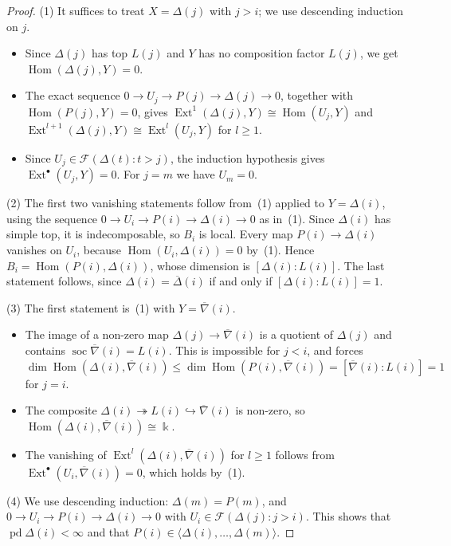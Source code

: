 \documentclass[11pt,reqno]{amsart}
\theoremstyle{plain}
\theoremstyle{definition}
\theoremstyle{remark}
\newcommand{\kk}{\Bbbk}
\DeclareMathOperator{\Hom}{Hom}
\DeclareMathOperator{\Ext}{Ext}
\DeclareMathOperator{\pd}{pd}
\DeclareMathOperator{\soc}{soc}
\newcommand{\thick}[1]{\langle #1\rangle}
\newcommand{\nablabar}{\overline{\nabla}}
\newcommand{\Deltabar}{\overline{\Delta}}
\newcommand{\cF}{\mathcal{F}}
\begin{document}
\begin{proof}
(1) It suffices to treat $X=\Delta(j)$ with $j>i$; we use descending induction on $j$.
\begin{itemize}
\item Since $\Delta(j)$ has top $L(j)$ and $Y$ has no composition factor $L(j)$, we get $\Hom(\Delta(j),Y)=0$.
\item The exact sequence $0\to U_j\to P(j)\to\Delta(j)\to0$, together with $\Hom(P(j),Y)=0$, gives $\Ext^1(\Delta(j),Y)\cong\Hom(U_j,Y)$ and $\Ext^{l+1}(\Delta(j),Y)\cong\Ext^l(U_j,Y)$ for $l\ge1$.
\item Since $U_j\in\cF(\Delta(t):t>j)$, the induction hypothesis gives $\Ext^\bullet(U_j,Y)=0$. For $j=m$ we have $U_m=0$.
\end{itemize}

(2) The first two vanishing statements follow from~(1) applied to $Y=\Delta(i)$, using the sequence $0\to U_i\to P(i)\to\Delta(i)\to0$ as in~(1). Since $\Delta(i)$ has simple top, it is indecomposable, so $B_i$ is local. Every map $P(i)\to\Delta(i)$ vanishes on $U_i$, because $\Hom(U_i,\Delta(i))=0$ by~(1). Hence $B_i=\Hom(P(i),\Delta(i))$, whose dimension is $[\Delta(i):L(i)]$. The last statement follows, since $\Delta(i)=\Deltabar(i)$ if and only if $[\Delta(i):L(i)]=1$.

(3) The first statement is~(1) with $Y=\nablabar(i)$.
\begin{itemize}
\item The image of a non-zero map $\Delta(j)\to\nablabar(i)$ is a quotient of $\Delta(j)$ and contains $\soc\nablabar(i)=L(i)$. This is impossible for $j<i$, and forces $\dim\Hom(\Delta(i),\nablabar(i))\le\dim\Hom(P(i),\nablabar(i))=[\nablabar(i):L(i)]=1$ for $j=i$.
\item The composite $\Delta(i)\twoheadrightarrow L(i)\hookrightarrow\nablabar(i)$ is non-zero, so $\Hom(\Delta(i),\nablabar(i))\cong\kk$.
\item The vanishing of $\Ext^{l}(\Delta(i),\nablabar(i))$ for $l\ge1$ follows from $\Ext^\bullet(U_i,\nablabar(i))=0$, which holds by~(1).
\end{itemize}

(4) We use descending induction: $\Delta(m)=P(m)$, and $0\to U_i\to P(i)\to\Delta(i)\to0$ with $U_i\in\cF(\Delta(j):j>i)$. This shows that $\pd\Delta(i)<\infty$ and that $P(i)\in\thick{\Delta(i),\dots,\Delta(m)}$.
\end{proof}

\end{document}
